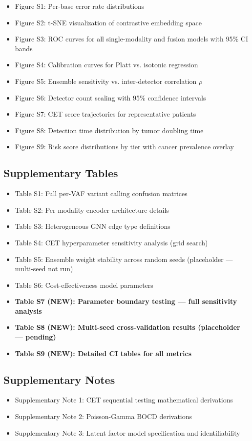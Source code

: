 \documentclass[10pt,a4paper]{article}
\begin{document}
\begin{itemize}
\item Figure S1: Per-base error rate distributions
\item Figure S2: t-SNE visualization of contrastive embedding space
\item Figure S3: ROC curves for all single-modality and fusion models with 95\% CI bands
\item Figure S4: Calibration curves for Platt vs. isotonic regression
\item Figure S5: Ensemble sensitivity vs. inter-detector correlation $\rho$
\item Figure S6: Detector count scaling with 95\% confidence intervals
\item Figure S7: CET score trajectories for representative patients
\item Figure S8: Detection time distribution by tumor doubling time
\item Figure S9: Risk score distributions by tier with cancer prevalence overlay
\end{itemize}

\subsection{Supplementary Tables}

\begin{itemize}
\item Table S1: Full per-VAF variant calling confusion matrices
\item Table S2: Per-modality encoder architecture details
\item Table S3: Heterogeneous GNN edge type definitions
\item Table S4: CET hyperparameter sensitivity analysis (grid search)
\item Table S5: Ensemble weight stability across random seeds (placeholder — multi-seed not run)
\item Table S6: Cost-effectiveness model parameters
\item \textbf{Table S7 (NEW): Parameter boundary testing — full sensitivity analysis}
\item \textbf{Table S8 (NEW): Multi-seed cross-validation results (placeholder — pending)}
\item \textbf{Table S9 (NEW): Detailed CI tables for all metrics}
\end{itemize}

\subsection{Supplementary Notes}

\begin{itemize}
\item Supplementary Note 1: CET sequential testing mathematical derivations
\item Supplementary Note 2: Poisson-Gamma BOCD derivations
\item Supplementary Note 3: Latent factor model specification and identifiability
\end{itemize}
\end{document}
